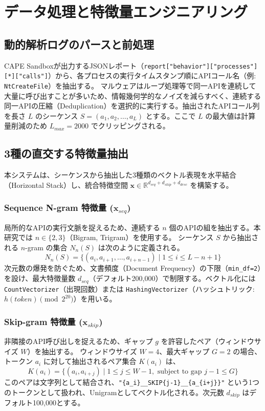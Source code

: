 \documentclass[11pt,a4paper,dvipdfmx]{article}
\begin{document}
\section{データ処理と特徴量エンジニアリング}

\subsection{動的解析ログのパースと前処理}
CAPE Sandboxが出力するJSONレポート（\texttt{report["behavior"]["processes"][*]["calls"]}）から、各プロセスの実行タイムスタンプ順にAPIコール名（例: \texttt{NtCreateFile}）を抽出する。
マルウェアはループ処理等で同一APIを連続して大量に呼び出すことが多いため、情報幾何学的なノイズを減らすべく、連続する同一APIの圧縮（Deduplication）を選択的に実行する。抽出されたAPIコール列を長さ $L$ のシーケンス $S = (a_1, a_2, \dots, a_L)$ とする。ここで $L$ の最大値は計算量削減のため $L_{max} = 2000$ でクリッピングされる。

\subsection{3種の直交する特徴量抽出}

本システムは、シーケンスから抽出した3種類のベクトル表現を水平結合（Horizontal Stack）し、統合特徴空間 $\mathbf{x} \in \mathbb{R}^{d_{seq} + d_{skip} + d_{desc}}$ を構築する。

\subsubsection{Sequence N-gram 特徴量 ($\mathbf{x}_{seq}$)}
局所的なAPIの実行文脈を捉えるため、連続する $n$ 個のAPIの組を抽出する。本研究では $n \in \{2, 3\}$（Bigram, Trigram）を使用する。
シーケンス $S$ から抽出される $n$-gram の集合 $N_n(S)$ は次のように定義される。
\begin{equation}
    N_n(S) = \{ (a_i, a_{i+1}, \dots, a_{i+n-1}) \mid 1 \le i \le L - n + 1 \}
\end{equation}
次元数の爆発を防ぐため、文書頻度（Document Frequency）の下限（\texttt{min\_df=2}）を設け、最大特徴量数 $d_{seq}$（デフォルト200,000）で制限する。ベクトル化には \texttt{CountVectorizer}（出現回数）または \texttt{HashingVectorizer}（ハッシュトリック: $h(token) \pmod{2^{20}}$）を用いる。

\subsubsection{Skip-gram 特徴量 ($\mathbf{x}_{skip}$)}
非隣接のAPI呼び出しを捉えるため、ギャップ $g$ を許容したペア（ウィンドウサイズ $W$）を抽出する。
ウィンドウサイズ $W=4$、最大ギャップ $G=2$ の場合、トークン $a_i$ に対して抽出されるペア集合 $K(a_i)$ は、
\begin{equation}
    K(a_i) = \{ (a_i, a_{i+j}) \mid 1 \le j \le W-1, \text{ subject to gap } j-1 \le G \}
\end{equation}
このペアは文字列として結合され、\texttt{"\{a\_i\}\_\_SKIP\{j-1\}\_\_\{a\_\{i+j\}\}"} という1つのトークンとして扱われ、Unigramとしてベクトル化される。次元数 $d_{skip}$ はデフォルト100,000とする。
\end{document}
